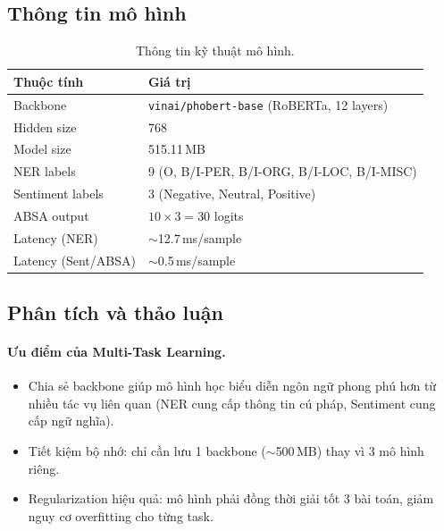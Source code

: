 \subsection{Thông tin mô hình}

\begin{table}[H]
\centering
\caption{Thông tin kỹ thuật mô hình.}
\label{tab:model_info}
\begin{tabular}{ll}
\toprule
\textbf{Thuộc tính} & \textbf{Giá trị} \\
\midrule
Backbone            & \texttt{vinai/phobert-base} (RoBERTa, 12 layers) \\
Hidden size         & 768 \\
Model size          & 515.11\,MB \\
NER labels          & 9 (O, B/I-PER, B/I-ORG, B/I-LOC, B/I-MISC) \\
Sentiment labels    & 3 (Negative, Neutral, Positive) \\
ABSA output         & $10 \times 3 = 30$ logits \\
Latency (NER)       & $\sim$12.7\,ms/sample \\
Latency (Sent/ABSA) & $\sim$0.5\,ms/sample \\
\bottomrule
\end{tabular}
\end{table}

\subsection{Phân tích và thảo luận}

\paragraph{Ưu điểm của Multi-Task Learning.}
\begin{itemize}
    \item Chia sẻ backbone giúp mô hình học biểu diễn ngôn ngữ phong phú hơn
          từ nhiều tác vụ liên quan (NER cung cấp thông tin cú pháp, Sentiment cung cấp ngữ nghĩa).
    \item Tiết kiệm bộ nhớ: chỉ cần lưu 1 backbone ($\sim$500\,MB) thay vì 3 mô hình riêng.
    \item Regularization hiệu quả: mô hình phải đồng thời giải tốt 3 bài toán,
          giảm nguy cơ overfitting cho từng task.
\end{itemize}

